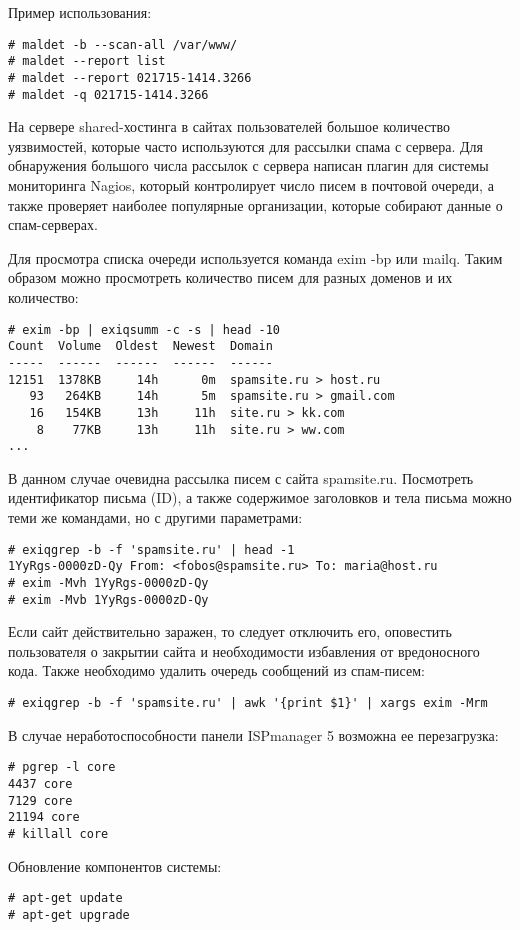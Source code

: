 Пример использования:
\begin{lstlisting}
# maldet -b --scan-all /var/www/
# maldet --report list
# maldet --report 021715-1414.3266
# maldet -q 021715-1414.3266
\end{lstlisting}

На сервере shared-хостинга в сайтах пользователей большое количество уязвимостей, которые часто используются для рассылки спама с сервера.
Для обнаружения большого числа рассылок с сервера написан плагин для системы мониторинга Nagios, который контролирует число писем в почтовой очереди, а также проверяет наиболее популярные организации, которые собирают данные о спам-серверах.

Для просмотра списка очереди используется команда exim -bp или mailq.
Таким образом можно просмотреть количество писем для разных доменов и их количество:
\begin{lstlisting}
# exim -bp | exiqsumm -c -s | head -10
Count  Volume  Oldest  Newest  Domain
-----  ------  ------  ------  ------
12151  1378KB     14h      0m  spamsite.ru > host.ru
   93   264KB     14h      5m  spamsite.ru > gmail.com
   16   154KB     13h     11h  site.ru > kk.com
    8    77KB     13h     11h  site.ru > ww.com
...
\end{lstlisting}

В данном случае очевидна рассылка писем с сайта spamsite.ru.
Посмотреть идентификатор письма (ID), а также содержимое заголовков и тела письма можно теми же командами, но с другими параметрами:
\begin{lstlisting}
# exiqgrep -b -f 'spamsite.ru' | head -1
1YyRgs-0000zD-Qy From: <fobos@spamsite.ru> To: maria@host.ru
# exim -Mvh 1YyRgs-0000zD-Qy
# exim -Mvb 1YyRgs-0000zD-Qy
\end{lstlisting}

Если сайт действительно заражен, то следует отключить его, оповестить пользователя о закрытии сайта и необходимости избавления от вредоносного кода.
Также необходимо удалить очередь сообщений из спам-писем:
\begin{lstlisting}
# exiqgrep -b -f 'spamsite.ru' | awk '{print $1}' | xargs exim -Mrm
\end{lstlisting}

В случае неработоспособности панели ISPmanager 5 возможна ее перезагрузка:
\begin{lstlisting}
# pgrep -l core
4437 core
7129 core
21194 core
# killall core
\end{lstlisting}

Обновление компонентов системы:
\begin{lstlisting}
# apt-get update
# apt-get upgrade
\end{lstlisting}


